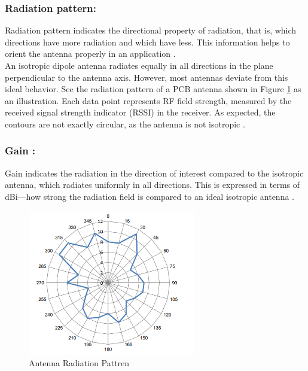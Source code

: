 \subsubsection{Radiation pattern:}
Radiation pattern indicates the directional property of radiation, that is, which directions have 
more radiation and which have less. This information helps to orient the antenna properly in an application \cite{AN91445}.\\


\indent An isotropic dipole antenna radiates equally in all directions in the plane perpendicular to the antenna axis. However, 
most antennas deviate from this ideal behavior. See the radiation pattern of a PCB antenna shown in Figure \ref{fig:ANTENNA_RADIATION_PATTERN} as an 
illustration. Each data point represents RF field strength, measured by the received signal strength indicator (RSSI) in 
the receiver. As expected, the contours are not exactly circular, as the antenna is not isotropic \cite{AN91445}.


\subsubsection{Gain :}
Gain indicates the radiation in the direction of interest compared to the isotropic antenna, which radiates 
uniformly in all directions. This is expressed in terms of dBi—how strong the radiation field is compared to an ideal 
isotropic antenna \cite{AN91445}.

\begin{figure}[h]
	\centering
	\includegraphics[width=0.65\textwidth]{Chap03/Figures/Antenna_Radiation_Pattren.PNG}
	\caption{Antenna Radiation Pattren}
	\label{fig:ANTENNA_RADIATION_PATTERN}
\end{figure}


